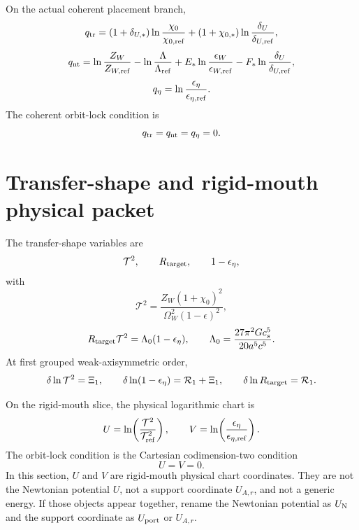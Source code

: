 On the actual coherent placement branch,
\begin{equation}
  q_{\rm tr}
  =
  (1+\delta_{U,*})\ln\frac{\chi_0}{\chi_{0,{\rm ref}}}
  +
  (1+\chi_{0,*})\ln\frac{\delta_U}{\delta_{U,{\rm ref}}},
\end{equation}
\begin{equation}
  q_{\rm nt}
  =
  \ln\frac{Z_W}{Z_{W,{\rm ref}}}
  -
  \ln\frac{\Lambda}{\Lambda_{\rm ref}}
  +
  E_*\ln\frac{\epsilon_W}{\epsilon_{W,{\rm ref}}}
  -
  F_*\ln\frac{\delta_U}{\delta_{U,{\rm ref}}},
\end{equation}
\begin{equation}
  q_\eta=\ln\frac{\epsilon_\eta}{\epsilon_{\eta,{\rm ref}}}.
\end{equation}
The coherent orbit-lock condition is
\begin{equation}
  q_{\rm tr}=q_{\rm nt}=q_\eta=0.
\end{equation}

\section{Transfer-shape and rigid-mouth physical packet}
\label{sec:rigid-mouth-notation}

The transfer-shape variables are
\begin{equation}
  \mathcal T^2,
  \qquad
  R_{\rm target},
  \qquad
  1-\epsilon_\eta,
\end{equation}
with
\begin{equation}
  \mathcal T^2
  =
  \frac{Z_W(1+\chi_0)^2}{\Omega_W^2(1-\epsilon)^2},
\end{equation}
\begin{equation}
  R_{\rm target}\mathcal T^2
  =
  \Lambda_0(1-\epsilon_\eta),
  \qquad
  \Lambda_0=\frac{27\pi^2Gc_s^5}{20a^5c^5}.
\end{equation}
At first grouped weak-axisymmetric order,
\begin{equation}
  \delta\ln\mathcal T^2=\Xi_1,
  \qquad
  \delta\ln(1-\epsilon_\eta)=\mathcal R_1+\Xi_1,
  \qquad
  \delta\ln R_{\rm target}=\mathcal R_1.
\end{equation}

On the rigid-mouth slice, the physical logarithmic chart is
\begin{equation}
  U=\ln\!\left(\frac{\mathcal T^2}{\mathcal T_{\rm ref}^2}\right),
  \qquad
  V=\ln\!\left(\frac{\epsilon_\eta}{\epsilon_{\eta,{\rm ref}}}\right).
\end{equation}
The orbit-lock condition is the Cartesian codimension-two condition
\begin{equation}
  U=V=0.
\end{equation}
In this section, \(U\) and \(V\) are rigid-mouth physical chart coordinates.  They are not the Newtonian potential \(U\), not a support coordinate \(U_{A,r}\), and not a generic energy.  If those objects appear together, rename the Newtonian potential as \(U_{\rm N}\) and the support coordinate as \(U_{\rm port}\) or \(U_{A,r}\).

